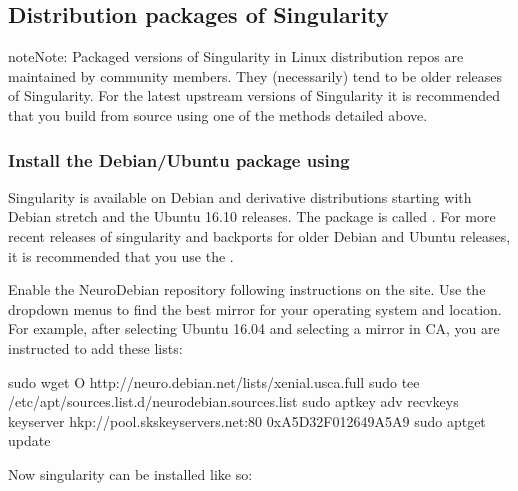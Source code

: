 \documentclass[letterpaper,10pt,english]{sphinxmanual}
\begin{document}
\subsection{Distribution packages of Singularity}
\label{\detokenize{installation:distribution-packages-of-singularity}}
\begin{sphinxadmonition}{note}{Note:}
Packaged versions of Singularity in Linux distribution repos are maintained
by community members. They (necessarily) tend to be older releases of
Singularity. For the latest upstream versions of Singularity it is
recommended that you build from source using one of the methods detailed
above.
\end{sphinxadmonition}


\subsubsection{Install the Debian/Ubuntu package using }
\label{\detokenize{installation:install-the-debian-ubuntu-package-using-apt}}
Singularity is available on Debian and derivative distributions starting with
Debian stretch and the Ubuntu 16.10 releases. The package is called
.  For more recent releases of singularity and
backports for older Debian and Ubuntu releases, it is recommended that you use
the .

Enable the NeuroDebian repository following instructions on the  site. Use the dropdown menus to find the best
mirror for your operating system and location. For example, after selecting
Ubuntu 16.04 and selecting a mirror in CA, you are instructed to add these
lists:

%
\begin{sphinxVerbatim}[commandchars=\\\{\}]
\PYGZdl{} sudo wget \PYGZhy{}O\PYGZhy{} http://neuro.debian.net/lists/xenial.us\PYGZhy{}ca.full \textbar{} sudo tee /etc/apt/sources.list.d/neurodebian.sources.list \PYGZam{}\PYGZam{} \PYGZbs{}
    sudo apt\PYGZhy{}key adv \PYGZhy{}\PYGZhy{}recv\PYGZhy{}keys \PYGZhy{}\PYGZhy{}keyserver hkp://pool.sks\PYGZhy{}keyservers.net:80 0xA5D32F012649A5A9 \PYGZam{}\PYGZam{} \PYGZbs{}
    sudo apt\PYGZhy{}get update
\end{sphinxVerbatim}

Now singularity can be installed like so:
\end{document}
